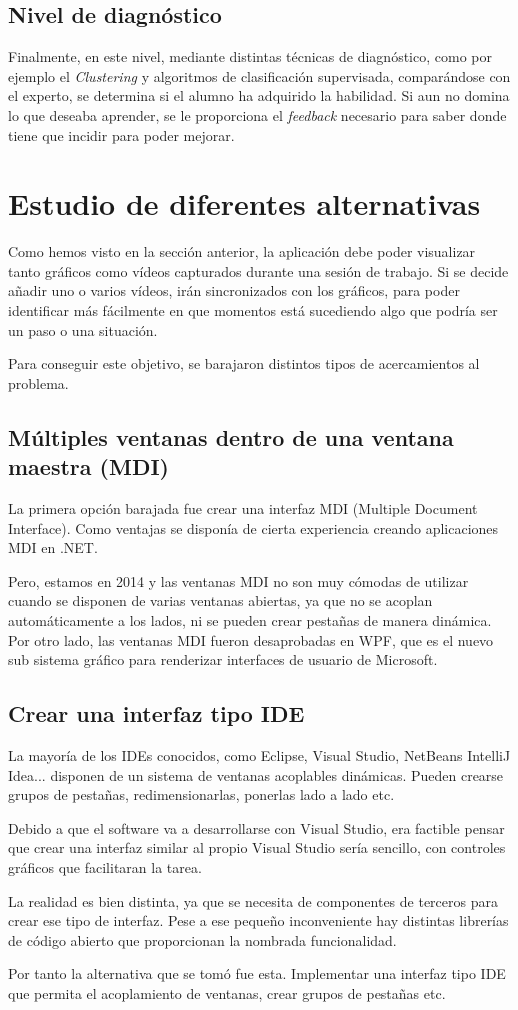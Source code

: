 \subsection{Nivel de diagn\'ostico}
Finalmente, en este nivel, mediante distintas t\'ecnicas de diagn\'ostico, como por ejemplo el \emph{Clustering} y
algoritmos de clasificaci\'on supervisada, compar\'andose con el experto,
se determina si el alumno ha adquirido la habilidad. Si aun no domina lo que deseaba aprender, se le proporciona el \emph{feedback} 
necesario para saber donde tiene que incidir para poder mejorar.

\section{Estudio de diferentes alternativas}
Como hemos visto en la secci\'on anterior, la aplicaci\'on debe poder visualizar tanto gr\'aficos como 
v\'ideos capturados durante una sesi\'on de trabajo. Si se decide a\~nadir uno o varios v\'ideos, ir\'an
sincronizados con los gr\'aficos, para poder identificar m\'as f\'acilmente en que momentos est\'a sucediendo
algo que podr\'ia ser un paso o una situaci\'on.

Para conseguir este objetivo, se barajaron distintos tipos de acercamientos al problema.

\subsection{M\'ultiples ventanas dentro de una ventana maestra (MDI)}
La primera opci\'on barajada fue crear una interfaz MDI (Multiple Document Interface). Como ventajas se
dispon\'ia de cierta experiencia creando aplicaciones MDI en .NET.

Pero, estamos en 2014 y las ventanas MDI no son muy c\'omodas de utilizar cuando se disponen de varias ventanas
abiertas, ya que no se acoplan autom\'aticamente a los lados, ni se pueden crear pesta\~nas de manera din\'amica.
Por otro lado, las ventanas MDI fueron desaprobadas en WPF, que es el nuevo sub sistema gr\'afico para renderizar 
interfaces de usuario de Microsoft.

\subsection{Crear una interfaz tipo IDE}
La mayor\'ia de los IDEs conocidos, como Eclipse, Visual Studio, NetBeans IntelliJ Idea... disponen de un sistema de 
ventanas acoplables din\'amicas. Pueden crearse grupos de pesta\~nas, redimensionarlas, ponerlas lado a lado etc.

Debido a que el software va a desarrollarse con Visual Studio, era factible pensar que crear una interfaz similar al propio
Visual Studio ser\'ia sencillo, con controles gr\'aficos que facilitaran la tarea.

La realidad es bien distinta, ya que se necesita de componentes de terceros para crear ese tipo de interfaz. Pese a ese
peque\~no inconveniente hay distintas librer\'ias de c\'odigo abierto que proporcionan la nombrada funcionalidad.

Por tanto la alternativa que se tom\'o fue esta. Implementar una interfaz tipo IDE que permita el acoplamiento de ventanas,
crear grupos de pesta\~nas etc.